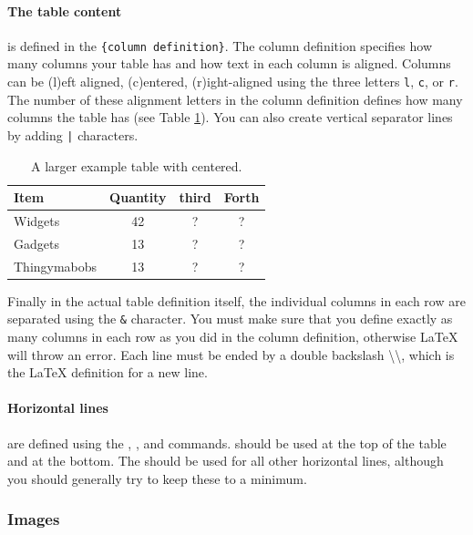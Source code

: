 \documentclass[a4paper,10pt]{ehu_webdev_report}
\begin{document}
\paragraph{The table content} is defined in the \texttt{\{column definition\}}. The column definition specifies how many columns your table has and how text in each column is aligned. Columns can be (l)eft aligned, (c)entered, (r)ight-aligned using the three letters \texttt{l}, \texttt{c}, or \texttt{r}. The number of these alignment letters in the column definition defines how many columns the table has (see Table \ref{tab:big-widgets}). You can also create vertical separator lines by adding \texttt{|} characters.

\begin{table}
  \caption{A larger example table with centered.}
  \label{tab:big-widgets}
  \centering
  \begin{tabular}{l|c|c|c}
    \toprule
    Item & Quantity & third & Forth \\
    \midrule
    Widgets & 42 & ? & ? \\
    Gadgets & 13 & ? & ? \\
    Thingymabobs & 13 & ? & ? \\
    \bottomrule
  \end{tabular}
\end{table}

Finally in the actual table definition itself, the individual columns in each row are separated using the \texttt{\&} character. You must make sure that you define exactly as many columns in each row as you did in the column definition, otherwise \LaTeX{} will throw an error. Each line must be ended by a double backslash \textbackslash\textbackslash, which is the \LaTeX{} definition for a new line.

\paragraph{Horizontal lines} are defined using the , , and  commands.  should be used at the top of the table and  at the bottom. The  should be used for all other horizontal lines, although you should generally try to keep these to a minimum.

\subsubsection{Images}
\end{document}
